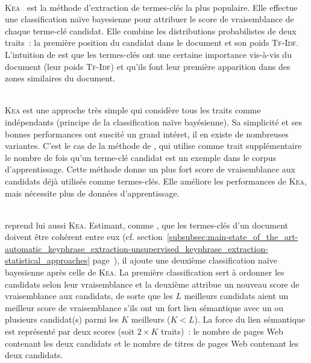        ~\\\textsc{Kea}~\cite{witten1999kea} est la méthode d'extraction de
        termes-clés la plus populaire. Elle effectue une classification naïve
        bayesienne pour attribuer le score de vraisemblance de chaque terme-clé
        candidat. Elle combine les distributions probabilistes de deux traits~:
        la première position du candidat dans le document et son poids \textsc{Tf-Idf}.
        L'intuition de  est que les termes-clés ont une
        certaine importance vis-à-vis du document (leur poids \textsc{Tf-Idf}) et qu'ils
        font leur première apparition dans des zones similaires du document.

        ~\\\textsc{Kea} est une approche très simple qui considère tous les
        traits comme indépendants (principe de la classification naïve
        bayésienne). Sa simplicité et ses bonnes performances ont suscité un
        grand intéret, il en existe de nombreuses variantes. C'est le cas de la
        méthode de , qui utilise comme trait
        supplémentaire le nombre de fois qu'un terme-clé candidat est un exemple
        dans le corpus d'apprentissage. Cette méthode donne un plus fort score
        de vraisemblance aux candidats déjà utilisés comme termes-clés. Elle
        améliore les performances de \textsc{Kea}, mais nécessite plus de
        données d'apprentissage.
        
        ~\\ reprend lui aussi \textsc{Kea}.
        Estimant, comme , que les
        termes-clés d'un document doivent être cohérent entre eux (cf.
        section~\ref{subsubsec:main-state_of_the_art-automatic_keyphrase_extraction-unsupervised_keyphrase_extraction-statistical_approaches}
        page~\pageref{subsubsec:main-state_of_the_art-automatic_keyphrase_extraction-unsupervised_keyphrase_extraction-statistical_approaches:ilp}),
        il ajoute une deuxième classification naïve bayesienne après celle de
        \textsc{Kea}. La première classification sert à ordonner les candidats
        selon leur vraisemblance et la deuxième attribue un nouveau score de
        vraisemblance aux candidats, de sorte que les $L$ meilleurs candidats
        aient un meilleur score de vraisemblance s'ils ont un fort lien
        sémantique avec un ou plusieurs candidat(s) parmi les $K$ meilleurs ($K
        < L$). La force du lien sémantique est représenté par deux scores (soit
        $2 \times K$ traits)~: le nombre de pages Web contenant les deux
        candidats et le nombre de titres de pages Web contenant les deux
        candidats.

